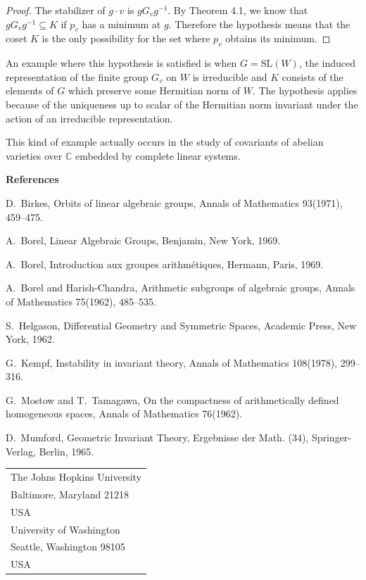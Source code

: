 \documentclass[11pt]{article}
\theoremstyle{plain}
\newcommand{\C}{\mathbb{C}}
\begin{document}
\begin{proof}
The stabilizer of $g\cdot v$ is $gG_vg^{-1}$. By Theorem 4.1, we know that
$gG_vg^{-1}\subseteq K$ if $p_v$ has a minimum at $g$. Therefore the hypothesis
means that the coset $K$ is the only possibility for the set where $p_v$ obtains
its minimum.
\end{proof}

An example where this hypothesis is satisfied is when $G=\mathrm{SL}(W)$, the
induced representation of the finite group $G_v$ on $W$ is irreducible and $K$
consists of the elements of $G$ which preserve some Hermitian norm of $W$.
The hypothesis applies because of the uniqueness up to scalar of the Hermitian
norm invariant under the action of an irreducible representation.

This kind of example actually occurs in the study of covariants of abelian
varieties over $\C$ embedded by complete linear systems.

\bigskip
\begin{flushleft}
\textbf{References}
\end{flushleft}
\begin{list}{}{\setlength{\leftmargin}{2.5em}\setlength{\labelwidth}{2em}%
  \setlength{\itemindent}{-2.5em}\setlength{\itemsep}{0.6ex}}
\item[{[1]}] D.~Birkes, Orbits of linear algebraic groups, Annals of Mathematics
  93(1971), 459--475.%
\item[{[2]}] A.~Borel, Linear Algebraic Groups, Benjamin, New York, 1969.
\item[{[3]}] A.~Borel, Introduction aux groupes arithmétiques, Hermann, Paris,
  1969.%
\item[{[4]}] A.~Borel and Harish-Chandra, Arithmetic subgroups of algebraic
  groups, Annals of Mathematics 75(1962), 485--535.
\item[{[5]}] S.~Helgason, Differential Geometry and Symmetric Spaces, Academic
  Press, New York, 1962.
\item[{[6]}] G.~Kempf, Instability in invariant theory, Annals of Mathematics
  108(1978), 299--316.%
\item[{[7]}] G.~Mostow and T.~Tamagawa, On the compactness of arithmetically
  defined homogeneous spaces, Annals of Mathematics 76(1962).
\item[{[8]}] D.~Mumford, Geometric Invariant Theory, Ergebnisse der Math. (34),
  Springer-Verlag, Berlin, 1965.
\end{list}

\bigskip\bigskip
\begin{flushright}
\begin{tabular}{l}
The Johns Hopkins University\\
Baltimore, Maryland 21218\\
USA\\[1.5em]
University of Washington\\
Seattle, Washington 98105\\
USA
\end{tabular}
\end{flushright}
\end{document}
